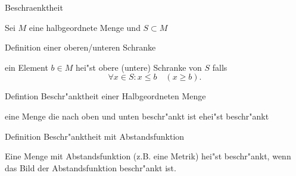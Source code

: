 \documentclass[class=article, crop=false]{standalone}
\begin{document}
\begin{zettel}{Beschraenktheit}

Sei $M$ eine halbgeordnete Menge und $S \subset M$

\begin{flashcard}[]{}
	\begin{question}
		Definition einer oberen/unteren Schranke
	\end{question}
	\begin{definition}
		ein Element $b \in  M$ hei"st obere (untere) Schranke von $S$ falls
		\[
			\forall x \in  S : x \leq b \quad ( x \geq b)
		.\]

	\end{definition}
\end{flashcard}

\begin{flashcard}[]{}
	\begin{question}
		Defintion Beschr"anktheit einer Halbgeordneten Menge
	\end{question}
	\begin{definition}
		eine Menge die nach oben und unten beschr"ankt ist ehei"st beschr"ankt
	\end{definition}
\end{flashcard}

\begin{flashcard}[]{}
	\begin{question}
		Definition Beschr"anktheit mit Abstandsfunktion
	\end{question}
	\begin{definition}
		Eine Menge mit Abstandsfunktion (z.B. eine Metrik) hei"st beschr"ankt, wenn das Bild der Abstandsfunktion beschr"ankt ist.
	\end{definition}
\end{flashcard}

\end{zettel}
\end{document}
